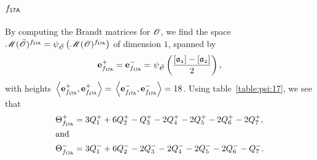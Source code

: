 \subsection{$f_\mathsf{{17A}}$}
By computing the Brandt matrices for ${\mathscr{O}}$,
we find the space $\operatorname{{\mathscr M}}({\tilde{{\mathscr{O}}}})^{f_\mathsf{{17A}}}
=\psi_{{\tilde{{\mathscr{O}}}}}\left(\operatorname{{\mathscr M}}({\mathscr{O}})^{f_\mathsf{{17A}}}\right)
$
of dimension $1$, spanned by
\begin{align*}
  \e{\mf{17A}}^+ = \e{\mf{17A}}^- = &\ \psi_{\Ot}\left(\frac{\cls{a_{1}}-\cls{a_{2}}}{2}\right),\\
\end{align*}
with heights $\,\<\e{\mf{17A}}^+,\e{\mf{17A}}^+>=\,\<\e{\mf{17A}}^-,\e{\mf{17A}}^->=18$.
Using table~\ref{table:psi:17},
we see that
\begin{align*}
  {\Theta}^+_{f_\mathsf{{17A}}} & =  3Q_{1}^{+} + 6Q_{2}^{+} - Q_{3}^{+} - 2Q_{4}^{+} - 2Q_{5}^{+} - 2Q_{6}^{+} - 2Q_{7}^{+}, \\
\intertext{and}
  {\Theta}^-_{f_\mathsf{{17A}}} & =  3Q_{1}^{-} + 6Q_{2}^{-} - 2Q_{3}^{-} - 2Q_{4}^{-} - 2Q_{5}^{-} - 2Q_{6}^{-} - Q_{7}^{-}. \\
\end{align*}
